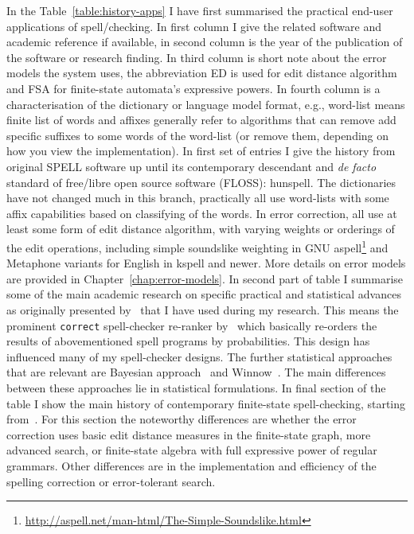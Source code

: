 \documentclass[officiallayout]{unihelcompling}
\begin{document}
In the Table~\ref{table:history-apps} I have first summarised the practical
end-user applications of spell\-/checking. In first column I give the
related software and academic reference if available, in second column is the
year of the publication of the software or research finding. In third column
is short note about the error models the system uses, the abbreviation ED is
used for edit distance algorithm and FSA for finite-state automata's 
expressive powers. In fourth column is a characterisation of the dictionary
or language model format, e.g., word-list means finite list of words and 
affixes generally refer to algorithms that can remove add specific suffixes to
some words of the word-list (or remove them, depending on how you view the
implementation).
In first set of entries I give the history from original SPELL software up
until its contemporary descendant and \emph{de facto} standard of
free/libre open source software (FLOSS): hunspell. The dictionaries have
not changed much in this branch, practically all use word-lists with some
affix capabilities based on classifying of the words. In error correction,
all use at least some form of edit distance algorithm, with varying weights
or orderings of the edit operations, including simple soundslike weighting
in GNU aspell\footnote{\url{http://aspell.net/man-html/The-Simple-Soundslike.html}} and Metaphone variants for English in kspell and newer. More details on
error models are provided in  Chapter~\ref{chap:error-models}.
In second part of table I summarise some of the main academic research
on specific practical and statistical advances as originally presented
by~\citet{al2006learning} that I have used during my research. This means the
prominent \texttt{correct} spell-checker re-ranker by~\citet{church1991probability} which basically re-orders the results of abovementioned spell programs by
probabilities. This design has influenced many of my spell-checker designs.
The further statistical approaches that are relevant are Bayesian 
approach~\citep{golding1995bayesian} and Winnow~\citep{golding1999winnow}. The
main differences between these approaches lie in statistical formulations.
In final section of the table I show the main history of contemporary 
finite-state spell-checking, starting from~\citet{oflazer1996errortolerant}.
For this section the noteworthy differences are whether the error correction
uses basic edit distance measures in the finite-state graph, more advanced
search, or finite-state algebra with full expressive power of regular grammars.
Other differences are in the implementation and efficiency of the
spelling correction or error-tolerant search.
\end{document}
